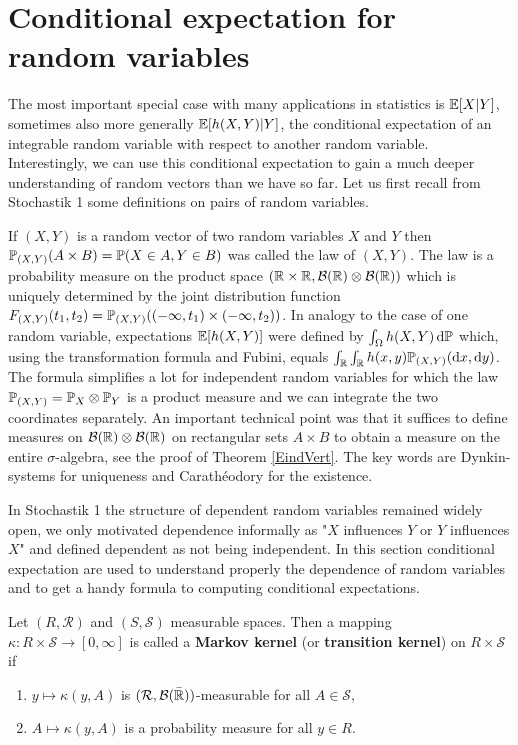 \section{Conditional expectation for random variables}
The most important special case with many applications in statistics is $\E[X|Y]$, sometimes also more generally $\E[h(X,Y)|Y]$, the conditional expectation of an integrable random variable with respect to another random variable. Interestingly, we can use this conditional expectation to gain a much deeper understanding of random vectors than we have so far. Let us first recall from Stochastik 1 some definitions on pairs of random variables.
\begin{lstep}
If $(X,Y)$ is a random vector of two random variables $X$ and $Y$ then $\P_{(X,Y)}(A\times B)=\P(X\in A, Y\in B)$ was called the law of $(X,Y)$. The law is a probability measure on the product space $(\R\times \R, \mathcal B(\R)\otimes \mathcal B(\R))$ which is uniquely determined by the joint distribution function $F_{(X,Y)}(t_1,t_2)=\P_{(X,Y)}((-\infty,t_1)\times (-\infty,t_2))$. In analogy to the case of one random variable, expectations $\E[h(X,Y)]$ were defined by $\int_\Omega h(X,Y)\dint \P$ which, using the transformation formula and Fubini, equals $\int_\R \int_\R h(x,y)  \P_{(X,Y)}(\textrm d x,\textrm d y)$. The formula simplifies a lot for independent random variables for which the law $\P_{(X,Y)}=\P_X\otimes \P_Y$ is a product measure and we can integrate the two coordinates separately. An important technical point was that it suffices to define measures on $\mathcal B(\R)\otimes \mathcal B(\R)$ on rectangular sets $A\times B$ to obtain a measure on the entire $\sigma$-algebra, see the proof of Theorem \ref{EindVert}. The key words are Dynkin-systems for uniqueness and Carath\'eodory for the existence.
\end{lstep}
 In Stochastik 1 the structure of dependent random variables remained widely open, we only motivated dependence informally as "{}$X$ influences $Y$ or $Y$ influences $X$"{} and defined dependent as not being independent. In this section conditional expectation are used to understand properly the  dependence of random variables and to get a handy formula to computing conditional expectations.
\begin{ldef}
\begin{deff}
	Let $(R,\mathcal R)$ and $(S, \mathcal S)$ measurable spaces. Then a mapping $\kappa: R\times \mathcal S\to [0,\infty]$ is called a \textbf{Markov kernel} (or \textbf{transition kernel}) on $R\times \mathcal S$ if 
	\begin{enumerate}[label=(\roman*)]
		\item $y\mapsto \kappa(y,A)$ is $(\mathcal R, \mathcal B(\bar \R))$-measurable for all $A\in \mathcal S$,
		\item $A\mapsto \kappa(y,A)$ is a probability measure for all $y\in R$.
	\end{enumerate}	
\end{deff}
\end{ldef}

